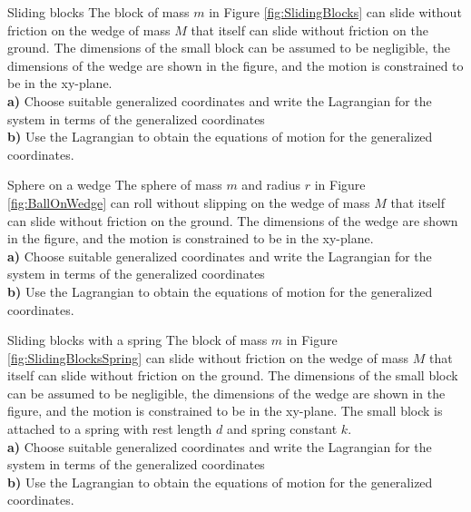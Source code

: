 \begin{problem}{Sliding blocks}
The block of mass $m$ in Figure \ref{fig:SlidingBlocks} can slide without friction on the wedge of mass $M$ that itself can slide without friction on the ground. The dimensions of the small block can be assumed to be negligible, the dimensions of the wedge are shown in the figure, and the motion is constrained to be in the xy-plane.
\\
\textbf{a)} Choose suitable generalized coordinates and write the Lagrangian for the system in terms of the generalized coordinates\\
\textbf{b)} Use the Lagrangian to obtain the equations of motion for the generalized coordinates.
\label{prob_Lagrange_9}
\end{problem}

\begin{problem}{Sphere on a wedge}
The sphere of mass $m$ and radius $r$ in Figure \ref{fig:BallOnWedge} can roll without slipping on the wedge of mass $M$ that itself can slide without friction on the ground. The dimensions of the wedge are shown in the figure, and the motion is constrained to be in the xy-plane.
\\
\textbf{a)} Choose suitable generalized coordinates and write the Lagrangian for the system in terms of the generalized coordinates\\
\textbf{b)} Use the Lagrangian to obtain the equations of motion for the generalized coordinates.
\label{prob_Lagrange_10}
\end{problem}

\begin{problem}{Sliding blocks with a spring}
The block of mass $m$ in Figure \ref{fig:SlidingBlocksSpring} can slide without friction on the wedge of mass $M$ that itself can slide without friction on the ground. The dimensions of the small block can be assumed to be negligible, the dimensions of the wedge are shown in the figure, and the motion is constrained to be in the xy-plane. The small block is attached to a spring with rest length $d$ and spring constant $k$.
\\
\textbf{a)} Choose suitable generalized coordinates and write the Lagrangian for the system in terms of the generalized coordinates\\
\textbf{b)} Use the Lagrangian to obtain the equations of motion for the generalized coordinates.
\label{prob_Lagrange_11}
\end{problem}

